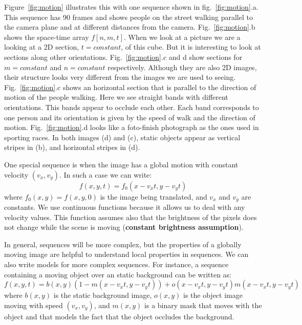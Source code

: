 Figure~\ref{fig:motion} illustrates this with one sequence shown in fig.~\ref{fig:motion}.a. This sequence has 90 frames and shows people on the street walking parallel to the camera plane and at different distances from the camera. Fig.~\ref{fig:motion}.b shows the space-time array $f \left[n,m,t \right]$. When we look at a picture we are a looking at a 2D section, $t=constant$, of this cube. But it is interesting to look at sections along other orientations.  Fig.~\ref{fig:motion}.c and d show sections for $m=constant$ and $n=constant$ respectively. Although they are also 2D images, their structure looks very different from the images we are used to seeing. Fig.~\ref{fig:motion}.c shows an horizontal section that is parallel to the direction of motion of the people walking. Here we see straight bands with different orientations. This bands appear to occlude each other. Each band corresponds to one person and its orientation is given by the speed of walk and the direction of motion. Fig.~\ref{fig:motion}.d looks like a foto-finish photograph as the ones used in sporting races. In both images (d) and (c), static objects appear as vertical stripes in (b), and horizontal stripes in (d).

One special sequence is when the image has a global motion with constant velocity $(v_x,v_y)$. In such a case we can write:
\begin{equation}
    f (x,y,t) = f_0 (x-v_xt,y-v_yt)
\end{equation}
where $f_0(x,y)= f (x,y,0)$ is the image being translated, and $v_x$ and $v_y$ are constants. We use continuous functions because it allows us to deal with any velocity values. This function assumes also that the brightness of the pixels does not change while the scene is moving ({\bf constant brightness assumption}).


In general, sequences will be more complex, but the properties of a globally moving image are helpful to understand local properties in sequences. We can also write models for more complex sequences. For instance, a sequence containing a moving object over an static background can be written as:
\begin{equation}
    f (x,y,t) = b(x,y) (1-m(x-v_xt,y-v_yt)) + o(x-v_xt,y-v_yt) m(x-v_x t,y-v_y t)
\end{equation}
where $b(x,y)$ is the static background image, $o(x,y)$ is the object image moving with speed $(v_x,v_y)$, and $m(x,y)$ is a binary mask that moves with the object and that models the fact that the object occludes the background.

